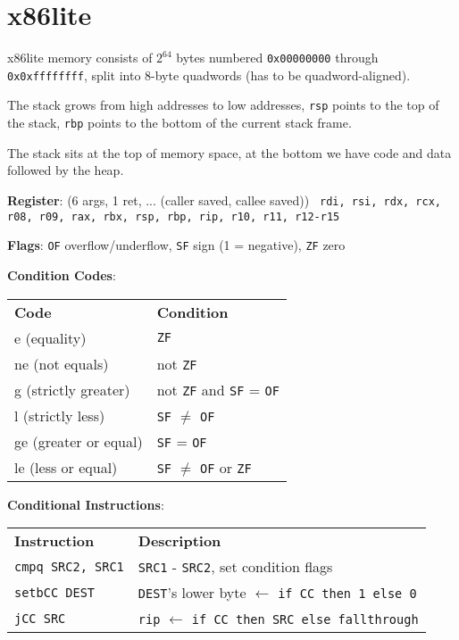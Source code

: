 \section*{x86lite}

x86lite memory consists of $2^{64}$ bytes numbered \texttt{0x00000000} through \texttt{0x0xffffffff}, split into 8-byte quadwords (has to be quadword-aligned). \medskip

The stack grows from high addresses to low addresses, \texttt{rsp} points to the top of the stack, \texttt{rbp} points to the bottom of the current stack frame. \medskip

The stack sits at the top of memory space, at the bottom we have code and data followed by the heap.\medskip

\textbf{Register}: (6 args, 1 ret, ... ({\color{orange}caller saved, \color{blue} callee saved}))
\texttt{\color{orange} rdi, rsi, rdx, rcx, r08, r09, rax, \color{blue} rbx, rsp, rbp, \color{black} rip, \color{orange} r10, r11, \color{blue} r12-r15}\medskip

\textbf{Flags}: \texttt{OF} overflow/underflow, \texttt{SF} sign (1 = negative), \texttt{ZF} zero \medskip

\textbf{Condition Codes}:
\begin{center}
	\begin{tabular}{l l}
		\textbf{Code}         & \textbf{Condition}                            \\
		e (equality)          & \texttt{ZF}                                   \\
		ne (not equals)       & not \texttt{ZF}                               \\
		g (strictly greater)  & not \texttt{ZF} and \texttt{SF} = \texttt{OF} \\
		l (strictly less)     & \texttt{SF} $\neq$ \texttt{OF}                \\
		ge (greater or equal) & \texttt{SF} = \texttt{OF}                     \\
		le (less or equal)    & \texttt{SF} $\neq$ \texttt{OF} or \texttt{ZF} \\
	\end{tabular}
\end{center}

\textbf{Conditional Instructions}:
\begin{center}
	\begin{tabular}{l l}
		\textbf{Instruction}         & \textbf{Description}                            \\
		\texttt{cmpq SRC2, SRC1}          & \texttt{SRC1} - \texttt{SRC2}, set condition flags             \\
        \texttt{setbCC DEST}          & \texttt{DEST}'s lower byte $\leftarrow$ \texttt{if CC then 1 else 0}          \\
        \texttt{jCC SRC}          & \texttt{rip} $\leftarrow$ \texttt{if CC then SRC else fallthrough}             \\
	\end{tabular}
\end{center}

